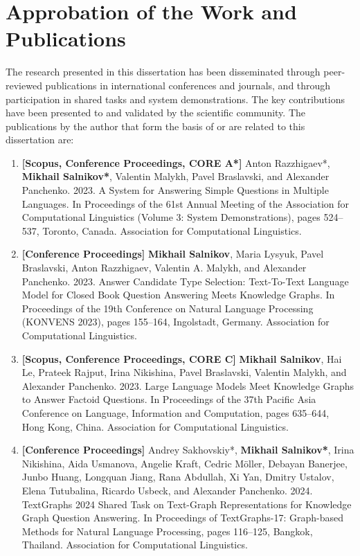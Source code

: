 \section*{Approbation of the Work and Publications}
\label{sec:synopsis:approbation}
The research presented in this dissertation has been disseminated through peer-reviewed publications in international conferences and journals, and through participation in shared tasks and system demonstrations. The key contributions have been presented to and validated by the scientific community.
The publications by the author that form the basis of or are related to this dissertation are:
\begin{enumerate}
    \item \textbf{[Scopus, Conference Proceedings, CORE A*]} Anton Razzhigaev*, \textbf{Mikhail Salnikov*}, Valentin Malykh, Pavel Braslavski, and Alexander Panchenko. 2023. A System for Answering Simple Questions in Multiple Languages. In Proceedings of the 61st Annual Meeting of the Association for Computational Linguistics (Volume 3: System Demonstrations), pages 524–537, Toronto, Canada. Association for Computational Linguistics.
    \item \textbf{[Conference Proceedings]} \textbf{Mikhail Salnikov}, Maria Lysyuk, Pavel Braslavski, Anton Razzhigaev, Valentin A. Malykh, and Alexander Panchenko. 2023. Answer Candidate Type Selection: Text-To-Text Language Model for Closed Book Question Answering Meets Knowledge Graphs. In Proceedings of the 19th Conference on Natural Language Processing (KONVENS 2023), pages 155–164, Ingolstadt, Germany. Association for Computational Linguistics. 
    \item \textbf{[Scopus, Conference Proceedings, CORE C]} \textbf{Mikhail Salnikov}, Hai Le, Prateek Rajput, Irina Nikishina, Pavel Braslavski, Valentin Malykh, and Alexander Panchenko. 2023. Large Language Models Meet Knowledge Graphs to Answer Factoid Questions. In Proceedings of the 37th Pacific Asia Conference on Language, Information and Computation, pages 635–644, Hong Kong, China. Association for Computational Linguistics.
    \item \textbf{[Conference Proceedings]} Andrey Sakhovskiy*, \textbf{Mikhail Salnikov*}, Irina Nikishina, Aida Usmanova, Angelie Kraft, Cedric Möller, Debayan Banerjee, Junbo Huang, Longquan Jiang, Rana Abdullah, Xi Yan, Dmitry Ustalov, Elena Tutubalina, Ricardo Usbeck, and Alexander Panchenko. 2024. TextGraphs 2024 Shared Task on Text-Graph Representations for Knowledge Graph Question Answering. In Proceedings of TextGraphs-17: Graph-based Methods for Natural Language Processing, pages 116–125, Bangkok, Thailand. Association for Computational Linguistics.

\end{enumerate}
